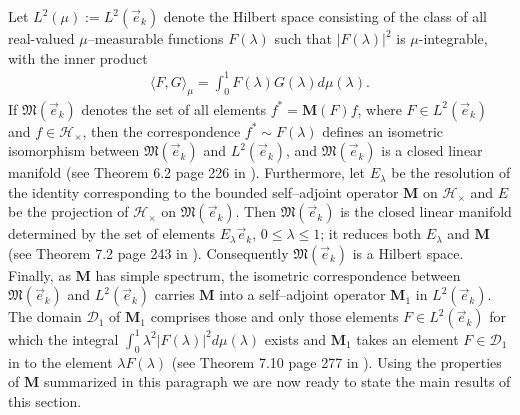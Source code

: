 \documentclass[english,12pt]{ttuthes}
\begin{document}
Let $L^2(\mu):=L^2(\vec{e}_k)$ denote the Hilbert space
consisting of the class of all real-valued $\mu$--measurable functions
$F(\lambda)$ such that $|F(\lambda)|^2$ is $\mu$-integrable, with the inner product
%
\begin{align}
  \langle F,G\rangle_\mu=\int_0^1F(\lambda)G(\lambda)d\mu(\lambda).
\end{align}
%
If $\mathfrak{M}(\vec{e}_k)$ denotes the set of all
elements $f^*=\mathbf{M}(F)f$, where $F\in L^2(\vec{e}_k)$ and
$f\in\mathscr{H}_\times$, then the correspondence $f^*\sim F(\lambda)$ defines
an isometric isomorphism between $\mathfrak{M}(\vec{e}_k)$ and
$L^2(\vec{e}_k)$, and $\mathfrak{M}(\vec{e}_k)$ is a closed linear
manifold (see Theorem 6.2 page 226 in \cite{Stone:64}). Furthermore,
let  $E_\lambda$ be the resolution of the identity corresponding to the
bounded self--adjoint operator $\mathbf{M}$ on $\mathscr{H}_\times$
and $E$ be the projection of $\mathscr{H}_\times$ on
$\mathfrak{M}(\vec{e}_k)$. Then $\mathfrak{M}(\vec{e}_k)$ is the
closed linear manifold  determined by the set of elements
$E_\lambda\vec{e}_k$, $0\leq\lambda\leq1$; it reduces both $E_\lambda$ and $\mathbf{M}$ (see
Theorem 7.2 page 243 in \cite{Stone:64}). Consequently
$\mathfrak{M}(\vec{e}_k)$ is a Hilbert space. Finally, as $\mathbf{M}$ 
has simple spectrum, the isometric correspondence between
$\mathfrak{M}(\vec{e}_k)$ and $L^2(\vec{e}_k)$ carries $\mathbf{M}$
into a self--adjoint operator $\mathbf{M}_1$ in $L^2(\vec{e}_k)$. The
domain $\mathcal{D}_1$ of $\mathbf{M}_1$ comprises those and only
those elements $F\in L^2(\vec{e}_k)$ for which the integral
$\int_0^1\lambda^2|F(\lambda)|^2d\mu(\lambda)$ exists and $\mathbf{M}_1$ takes an element
$F\in\mathcal{D}_1$ in to the element $\lambda F(\lambda)$ (see Theorem 7.10 page 277
in \cite{Stone:64}). Using the properties of $\mathbf{M}$ summarized
in this paragraph we are now ready to state the main results of this
section.
\end{document}
